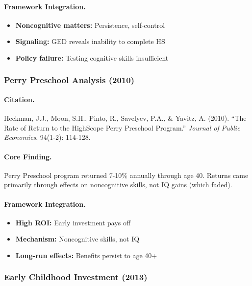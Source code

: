 \documentclass[12pt,a4paper]{article}
\begin{document}
\paragraph{Framework Integration.}
\begin{itemize}
  \item \textbf{Noncognitive matters:} Persistence, self-control
  \item \textbf{Signaling:} GED reveals inability to complete HS
  \item \textbf{Policy failure:} Testing cognitive skills insufficient
\end{itemize}

\subsubsection{Perry Preschool Analysis (2010)}

\paragraph{Citation.}
Heckman, J.J., Moon, S.H., Pinto, R., Savelyev, P.A., \& Yavitz, A. (2010).
``The Rate of Return to the HighScope Perry Preschool Program.''
\emph{Journal of Public Economics}, 94(1-2): 114-128.

\paragraph{Core Finding.}
Perry Preschool program returned 7-10\% annually through age 40.
Returns came primarily through effects on noncognitive skills,
not IQ gains (which faded).

\paragraph{Framework Integration.}
\begin{itemize}
  \item \textbf{High ROI:} Early investment pays off
  \item \textbf{Mechanism:} Noncognitive skills, not IQ
  \item \textbf{Long-run effects:} Benefits persist to age 40+
\end{itemize}

\subsubsection{Early Childhood Investment (2013)}
\end{document}
